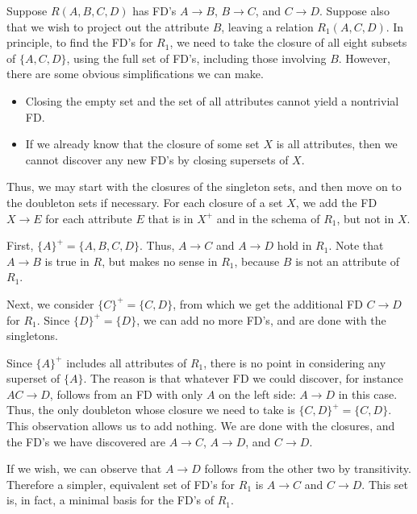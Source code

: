 \documentclass{article}
\begin{document}
      \begin{example}
        Suppose $R(A,B,C,D)$ has FD's $A \rightarrow B$, $B \rightarrow C$, and $C \rightarrow D$. Suppose also that we wish to project out the attribute $B$, leaving a relation $R_1(A,C,D)$. In principle, to find the FD's for $R_1$, we need to take the closure of all eight subsets of $\{A, C, D\}$, using the full set of FD's, including those involving $B$. However, there are some obvious simplifications we can make.

        \begin{itemize}
          \item Closing the empty set and the set of all attributes cannot yield a nontrivial FD.
          \item If we already know that the closure of some set $X$ is all attributes, then we cannot discover any new FD's by closing supersets of $X$.
        \end{itemize}

        Thus, we may start with the closures of the singleton sets, and then move on to the doubleton sets if necessary. For each closure of a set $X$, we add the FD $X \rightarrow E$ for each attribute $E$ that is in $X^+$ and in the schema of $R_1$, but not in $X$.

        First, $\{A\}^+ = \{A,B,C,D\}$. Thus, $A \rightarrow C$ and $A \rightarrow D$ hold in $R_1$. Note that $A \rightarrow B$ is true in $R$, but makes no sense in $R_1$, because $B$ is not an attribute of $R_1$.

        Next, we consider $\{C\}^+ = \{C,D\}$, from which we get the additional FD $C \rightarrow D$ for $R_1$. Since $\{D\}^+ = \{D\}$, we can add no more FD's, and are done with the singletons.

        Since $\{A\}^+$ includes all attributes of $R_1$, there is no point in considering any superset of $\{A\}$. The reason is that whatever FD we could discover, for instance $AC \rightarrow D$, follows from an FD with only $A$ on the left side: $A \rightarrow D$ in this case. Thus, the only doubleton whose closure we need to take is $\{C, D\}^+ = \{C,D\}$. This observation allows us to add nothing. We are done with the closures, and the FD's we have discovered are $A \rightarrow C$, $A \rightarrow D$, and $C \rightarrow D$.

        If we wish, we can observe that $A \rightarrow D$ follows from the other two by transitivity. Therefore a simpler, equivalent set of FD's for $R_1$ is $A \rightarrow C$ and $C \rightarrow D$. This set is, in fact, a minimal basis for the FD's of $R_1$. 
      \end{example}
\end{document}
